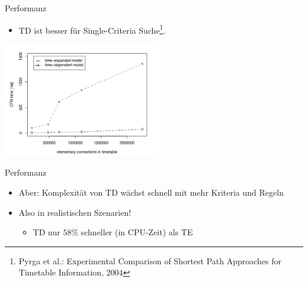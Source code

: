 \begin{frame}{Performanz}
	\begin{itemize}
		\item TD ist besser für Single-Criteria Suche\footnote{Pyrga et al.: Experimental Comparison of Shortest Path Approaches for Timetable Information, 2004}.
	\end{itemize}

		\begin{center}
		\includegraphics[height=5cm]{images/comparisons/comparison-simple.png} 
	\end{center}
\end{frame}


\begin{frame}{Performanz}
	\begin{itemize}
		\item Aber: Komplexität von TD wächst schnell mit mehr Kriteria und Regeln
		\item Also in realistischen Szenarien!
		\begin{itemize}
			\item TD nur $58\%$ schneller (in CPU-Zeit) als TE
		\end{itemize}
	\end{itemize}

\end{frame}